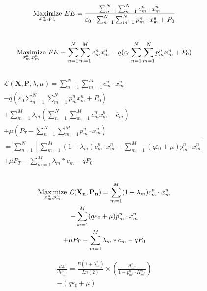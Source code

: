 \documentclass{article}
\begin{document}
	
	\begin{equation}
	\underset{x^n_m,p^n_m}{\rm Maximize}\ EE=\frac{\sum_{n=1}^{N}\sum_{m=1}^{N}c^n_m\cdot x^n_m}{\varepsilon_0\cdot \sum_{n=1}^{N}\sum_{m=1}^{N}p^n_m\cdot x^n_m+P_0}
	\end{equation}
	\\
	
	
	\begin{equation}
	\underset{x^n_m,p^n_m}{\rm Maximize}\ EE=\sum_{n=1}^{N}\sum_{m=1}^{M}c^n_m x^n_m-q(\varepsilon_0 \sum_{n=1}^{N}\sum_{m=1}^{N}p^n_m x^n_m+P_0)
	\end{equation}
	\\
	
	
	
	\begin{gather}
	\mathcal{L}(\mathbf{X},\mathbf{P},\lambda,\mu)=\sum_{n=1}^{N}\sum_{m=1}^{M}c^n_m\cdot x^n_m\nonumber\\-q\left(\varepsilon_0 \sum_{n=1}^{N}\sum_{m=1}^{N}p^n_m x^n_m+P_0\right)\nonumber\\+\sum_{m=1}^{M}\lambda_m\left(\sum_{n=1}^{N}\sum_{m=1}^{M}c^n_m x^n_m-\overline{c}_m\right)\nonumber\\+\mu\left(P_T-\sum_{n=1}^{N}\sum_{m=1}^{M}p^n_m \cdot x^n_m\right)\nonumber\\=\sum_{n=1}^{N}\left[\sum_{m=1}^{M}(1+\lambda_m)c^n_m\cdot x^n_m-\sum_{m=1}^{M}(q\varepsilon_0+\mu)p^n_m \cdot x^n_m\right]\nonumber\\+\mu P_T-\sum_{m=1}^{M}\lambda_m*\overline{c}_m-qP_0
	\end{gather}
	\\
	
	\begin{gather}
	\underset{x^n_m,p^n_m}{\rm Maximize}\  \mathcal{L}(\mathbf{X_n},\mathbf{P_n})=\sum_{m=1}^{M}(1+\lambda_m)c^n_m\cdot x^n_m\nonumber\\-\sum_{m=1}^{M}(q\varepsilon_0+\mu)p^n_m \cdot x^n_m\nonumber\\+\mu P_T-\sum_{m=1}^{M}\lambda_m*\overline{c}_m-qP_0	
	\end{gather}
	
	\begin{gather}
	\frac{d \mathcal{L}}{d p^n_{m^*}}=\frac{B(1+\lambda_m^*)}{Ln(2)}\times\left(\frac{H^n_{m^*}}{1+p^n_{m^*}\cdot H^n_{m^*}}\right)\nonumber\\-(q\varepsilon_0+\mu)
	\end{gather}
\end{document}
